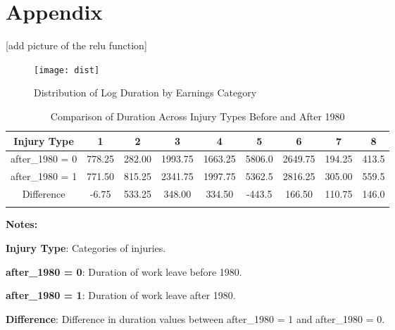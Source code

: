 \section*{Appendix}

[add picture of the relu function]



\begin{figure}[h]
\centering
\caption{Distribution of Log Duration by Earnings Category}
\texttt{[image: dist]}
\label{fig:log_duration_distribution}
\end{figure}




\begin{table}[ht]
\centering
\caption{Comparison of Duration Across Injury Types Before and After 1980}
\label{tab:duration}
\begin{threeparttable}
\begin{tabular}{ccccccccc}
Injury Type & \textbf{1} & \textbf{2} & \textbf{3} & \textbf{4} & \textbf{5} & \textbf{6} & \textbf{7} & \textbf{8} \\
\hline
\hline
\addlinespace
after\_1980 = 0 & 778.25 & 282.00 & 1993.75 & 1663.25 & 5806.0 & 2649.75 & 194.25 & 413.5 \\
after\_1980 = 1 & 771.50 & 815.25 & 2341.75 & 1997.75 & 5362.5 & 2816.25 & 305.00 & 559.5 \\
Difference & -6.75 & 533.25 & 348.00 & 334.50 & -443.5 & 166.50 & 110.75 & 146.0 \\ \addlinespace
\end{tabular}
\begin{tablenotes}
\small
\item \textbf{Notes:}
\item \textbf{Injury Type}: Categories of injuries.
\item \textbf{after\_1980 = 0}: Duration of work leave before 1980.
\item \textbf{after\_1980 = 1}: Duration of work leave  after 1980.
\item \textbf{Difference}: Difference in duration values between after\_1980 = 1 and after\_1980 = 0.
\end{tablenotes}
\end{threeparttable}
\end{table}



